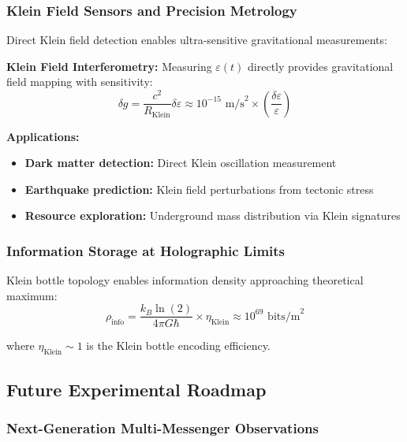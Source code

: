 \documentclass[12pt]{iopart}
\begin{document}
\subsubsection{Klein Field Sensors and Precision Metrology}

Direct Klein field detection enables ultra-sensitive gravitational measurements:

\textbf{Klein Field Interferometry:} Measuring $\varepsilon(t)$ directly provides gravitational field mapping with sensitivity:
\begin{equation}
\delta g = \frac{c^2}{R_{\text{Klein}}} \delta \varepsilon \approx 10^{-15} \text{ m/s}^2 \times \left(\frac{\delta \varepsilon}{\varepsilon}\right)
\label{eq:gravity_sensitivity}
\end{equation}

\textbf{Applications:}
\begin{itemize}
\item \textbf{Dark matter detection:} Direct Klein oscillation measurement
\item \textbf{Earthquake prediction:} Klein field perturbations from tectonic stress
\item \textbf{Resource exploration:} Underground mass distribution via Klein signatures
\end{itemize}

\subsubsection{Information Storage at Holographic Limits}

Klein bottle topology enables information density approaching theoretical maximum:
\begin{equation}
\rho_{\text{info}} = \frac{k_B \ln(2)}{4 \pi G \hbar} \times \eta_{\text{Klein}} \approx 10^{69} \text{ bits/m}^2
\label{eq:holographic_storage}
\end{equation}

where $\eta_{\text{Klein}} \sim 1$ is the Klein bottle encoding efficiency.

\subsection{Future Experimental Roadmap}

\subsubsection{Next-Generation Multi-Messenger Observations}
\end{document}
